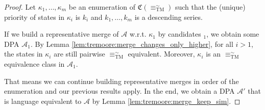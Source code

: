\begin{proof}
	Let $\kappa_1, \dots, \kappa_m$ be an enumeration of $\mathfrak{C}(\equiv^\sim_\text{TM})$ such that the (unique) priority of states in $\kappa_i$ is $k_i$ and $k_1, \dots, k_m$ is a descending series.
	
	If we build a representative merge of $\mathcal{A}$ w.r.t. $\kappa_1$ by candidates $_1$, we obtain some DPA $\mathcal{A}_1$. By Lemma \ref{lem:tremoore:merge_changes_only_higher}, for all $i > 1$, the states in $\kappa_i$ are still pairwise $\equiv^\sim_\text{TM}$ equivalent. Moreover, $\kappa_i$ is an $\equiv^\sim_\text{TM}$ equivalence class in $\mathcal{A}_1$.
	
	That means we can continue building representative merges in order of the enumeration and our previous results apply. In the end, we obtain a DPA $\mathcal{A}'$ that is language equivalent to $\mathcal{A}$ by Lemma \ref{lem:tremoore:merge_keep_sim}.
\end{proof}

\newpage






















